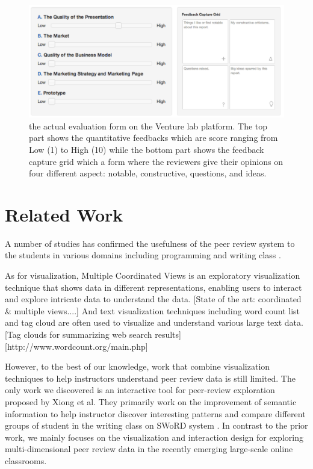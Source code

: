 \documentclass{sigchi}
\begin{document}
\begin{figure}[!t]
\centering
\includegraphics[width=\columnwidth]{images/review-form}
\caption{the actual evaluation form on the Venture lab platform.
The top part shows the quantitative feedbacks which are score ranging
from Low (1) to High (10) while the bottom part shows the feedback capture grid
which a form where the reviewers give their opinions
on four different aspect: notable, constructive, questions, and ideas.}
\label{fig:review-form}
\end{figure}



\section{Related Work}

A number of studies has confirmed the usefulness of the peer review system
to the students in various domains including programming and writing class
\cite{MyPeerReview,WebBasedPeerReview}.

As for visualization, Multiple Coordinated Views is an exploratory visualization
technique that shows data in different representations, enabling users to
interact and explore intricate data to understand the data.  [State of the art:
coordinated \& multiple views....] And text visualization techniques including
word count list and tag cloud are often used to visualize and understand various
large text data.[Tag clouds for summarizing web search
results][http://www.wordcount.org/main.php]


However, to the best of our knowledge, work that combine visualization techniques
to help instructors understand peer review data is still limited.
The only work we discovered is  an interactive tool for peer-review exploration
proposed by Xiong et al. \cite{xiong}
They primarily work on the improvement of semantic information
to help instructor discover interesting patterns and
compare different groups of student in the writing class on SWoRD system \cite{Cho2007}.
In contrast to the prior work, we mainly focuses on the visualization
and interaction design for exploring multi-dimensional peer review data
in the recently emerging large-scale online classrooms.
\end{document}

